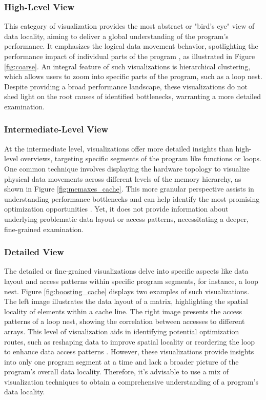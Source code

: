 \subsubsection{High-Level View}\label{sec:coarse_view}
This category of visualization provides the most abstract or "bird's eye" view of data locality, aiming to deliver a global understanding of the program's performance. It emphasizes the logical data movement behavior, spotlighting the performance impact of individual parts of the program \cite{schaad2021boosting,schaad2022boosting,gimenez2017memaxes,adhianto2010hpctoolkit}, as illustrated in Figure \ref{fig:coarse}. An integral feature of such visualizations is hierarchical clustering, which allows users to zoom into specific parts of the program, such as a loop nest. Despite providing a broad performance landscape, these visualizations do not shed light on the root causes of identified bottlenecks, warranting a more detailed examination.

\subsubsection{Intermediate-Level View}\label{sec:medium_view}
At the intermediate level, visualizations offer more detailed insights than high-level overviews, targeting specific segments of the program like functions or loops. One common technique involves displaying the hardware topology to visualize physical data movements across different levels of the memory hierarchy, as shown in Figure \ref{fig:memaxes_cache}. This more granular perspective assists in understanding performance bottlenecks and can help identify the most promising optimization opportunities \cite{gimenez2017memaxes,choudhury2011abstract}. Yet, it does not provide information about underlying problematic data layout or access patterns, necessitating a deeper, fine-grained examination.

\subsubsection{Detailed View}\label{sec:fine_view}
The detailed or fine-grained visualizations delve into specific aspects like data layout and access patterns within specific program segments, for instance, a loop nest. Figure \ref{fig:boosting_cache} displays two examples of such visualizations. The left image illustrates the data layout of a matrix, highlighting the spatial locality of elements within a cache line. The right image presents the access patterns of a loop nest, showing the correlation between accesses to different arrays. This level of visualization aids in identifying potential optimization routes, such as reshaping data to improve spatial locality or reordering the loop to enhance data access patterns \cite{schaad2022boosting}. However, these visualizations provide insights into only one program segment at a time and lack a broader picture of the program's overall data locality. Therefore, it's advisable to use a mix of visualization techniques to obtain a comprehensive understanding of a program's data locality.
